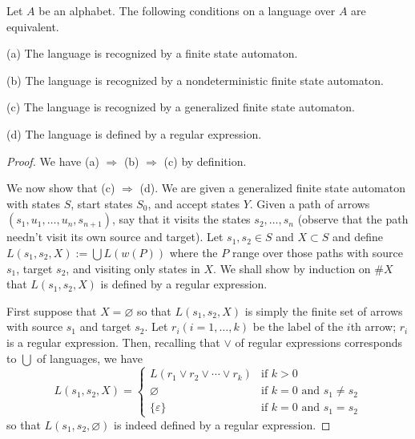 \begin{thm} Let $A$ be an alphabet. The
    following conditions on a language over $A$ are equivalent.

    (a) The language is recognized by a finite state automaton.

    (b) The language is recognized by a nondeterministic finite state automaton.

    (c) The language is recognized by a generalized finite state automaton.

    (d) The language is defined by a regular expression.
\end{thm}

\begin{proof} We have (a) $\Rightarrow$ (b) $\Rightarrow$ (c) by
    definition.

    We now show that (c) $\Rightarrow$ (d). We are given a generalized
    finite state automaton with states $S$, start states $S_0$, and
    accept states $Y$. Given a path of arrows
    $(s_1,u_1,\dots,u_n,s_{n+1})$, say that it visits the states
    $s_2,\dots,s_n$ (observe that the path needn't visit its own
    source and target). Let $s_1,s_2 \in S$ and $X\subset S$ and
    define $L(s_1,s_2,X) := \bigcup L(w(P))$ where the $P$ range over
    those paths with source $s_1$, target $s_2$, and visiting only
    states in $X$. We shall show by induction on $\#X$ that
    $L(s_1,s_2,X)$ is defined by a regular expression.

    First suppose that $X=\varnothing$ so that $L(s_1,s_2,X)$ is
    simply the finite set of arrows with source $s_1$ and target
    $s_2$. Let $r_i (i = 1, \dots ,k)$  be the label of the $i$th
    arrow; $r_i$ is a regular expression. Then, recalling that $\vee$
    of regular expressions corresponds to $\bigcup$ of languages,  we
    have
    \[ L(s_1,s_2,X) =
    \begin{cases}
        L(r_1 \vee r_2 \vee \cdots \vee r_k) & \text{if } k > 0\\
        \varnothing & \text{if } k=0 \text{ and } s_1 \neq s_2\\
        \{\varepsilon\} & \text{if } k=0 \text{ and } s_1 = s_2
    \end{cases} \] so that $L(s_1,s_2,\varnothing)$ is indeed defined
    by a regular expression.


\end{proof}
